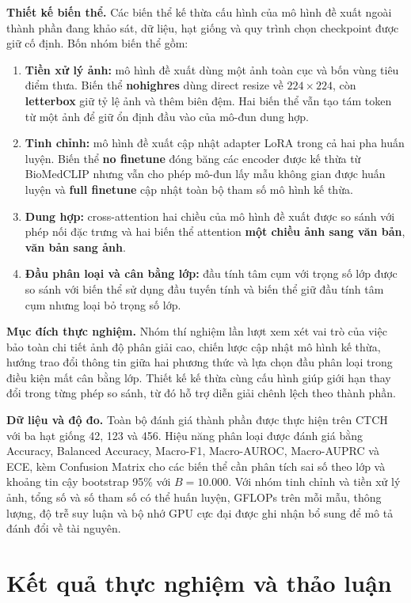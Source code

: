 \textbf{Thiết kế biến thể.} Các biến thể kế thừa cấu hình của mô hình đề xuất ngoài thành phần đang khảo sát, dữ liệu, hạt giống và quy trình chọn checkpoint được giữ cố định. Bốn nhóm biến thể gồm:
\begin{enumerate}
    \item \textbf{Tiền xử lý ảnh:} mô hình đề xuất dùng một ảnh toàn cục và
    bốn vùng tiêu điểm thưa. Biến thể \textbf{nohighres} dùng direct resize về $224\times224$, còn \textbf{letterbox} giữ tỷ lệ ảnh và thêm biên đệm. Hai biến thể vẫn tạo tám token từ một ảnh để giữ ổn định đầu vào của mô-đun dung hợp.
    \item \textbf{Tinh chỉnh:} mô hình đề xuất cập nhật adapter
    LoRA trong cả hai pha huấn luyện. Biến thể \textbf{no finetune} đóng băng các encoder được kế thừa từ BioMedCLIP \cite{BiomedCLIP} nhưng vẫn cho phép mô-đun lấy mẫu không gian được huấn luyện và \textbf{full finetune} cập nhật toàn bộ tham số mô hình kế thừa.
    \item \textbf{Dung hợp:} cross-attention hai chiều của mô hình đề xuất
    được so sánh với phép nối đặc trưng và hai biến thể attention
    \textbf{một chiều ảnh sang văn bản}, \textbf{văn bản sang ảnh}.
    \item \textbf{Đầu phân loại và cân bằng lớp:} đầu tính tâm cụm với
    trọng số lớp được so sánh với biến thể sử dụng đầu tuyến tính và biến thể giữ đầu tính tâm cụm nhưng loại bỏ trọng số lớp.
\end{enumerate}

\textbf{Mục đích thực nghiệm.} Nhóm thí nghiệm lần lượt xem xét vai trò của việc bảo toàn chi tiết ảnh độ phân giải cao, chiến lược cập nhật mô hình kế thừa, hướng trao đổi thông tin giữa hai phương thức và lựa chọn đầu phân loại trong điều kiện mất cân bằng lớp. Thiết kế kế thừa cùng cấu hình giúp giới hạn thay đổi trong từng phép so sánh, từ đó hỗ trợ diễn giải chênh lệch theo thành phần.

\textbf{Dữ liệu và độ đo.} Toàn bộ đánh giá thành phần được thực hiện trên CTCH với ba hạt giống 42, 123 và 456. Hiệu năng phân loại được đánh giá bằng Accuracy, Balanced Accuracy, Macro-F1, Macro-AUROC, Macro-AUPRC và ECE, kèm Confusion Matrix cho các biến thể cần phân tích sai số theo lớp và khoảng tin cậy bootstrap 95\% với $B=10.000$. Với nhóm tinh chỉnh và tiền xử lý ảnh, tổng số và số tham số có thể huấn luyện, GFLOPs trên mỗi mẫu, thông lượng, độ trễ suy luận và bộ nhớ GPU cực đại được ghi nhận bổ sung để mô tả đánh đổi về tài nguyên.

\section{Kết quả thực nghiệm và thảo luận}
\label{sec:ch4draft_results}


